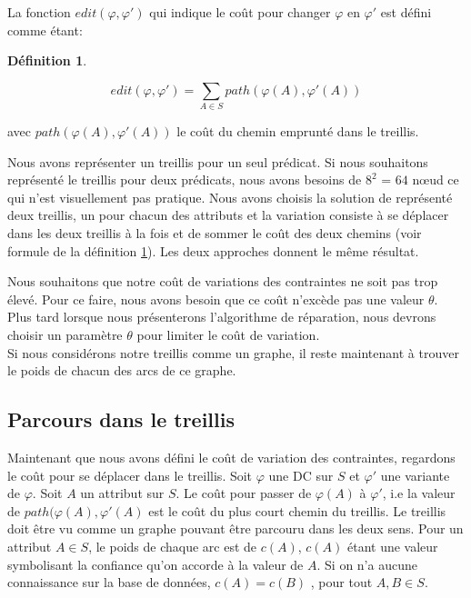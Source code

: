\documentclass[letterpaper, 12pt]{report}
\theoremstyle{definition}
\newtheorem{mydef}{Définition}
\begin{document}
La fonction $edit(\varphi , \varphi ')$ qui indique le coût pour changer $\varphi$ en $\varphi'$ est défini comme étant:

\begin{mydef} \label{edit}

$$
 edit(\varphi, \varphi') = \sum_{A \in S} path(\varphi(A),\varphi'(A))$$
 
avec $path(\varphi(A),\varphi'(A))$ le coût du chemin emprunté dans le treillis.
\end{mydef}

Nous avons représenter un treillis pour un seul prédicat. Si nous souhaitons représenté le treillis pour deux prédicats, nous avons besoins de $8^2$ = $64$ nœud ce qui n'est visuellement pas pratique. Nous avons choisis la solution de représenté deux treillis, un pour chacun des attributs et la variation consiste à se déplacer dans les deux treillis à la fois et de sommer le coût des deux chemins (voir formule de la définition \ref{edit}). Les deux approches donnent le même résultat.

Nous souhaitons que notre coût de variations des contraintes ne soit pas trop élevé. Pour ce faire, nous avons besoin que ce coût n'excède pas une valeur $\theta$. Plus tard lorsque nous présenterons l'algorithme de réparation, nous devrons choisir un paramètre $\theta$ pour limiter le coût de variation.\\

Si nous considérons notre treillis comme un graphe, il reste maintenant à trouver le poids de chacun des arcs de ce graphe. 

\subsection{Parcours dans le treillis}

	Maintenant que nous avons défini le coût de variation des contraintes, regardons le coût pour se déplacer dans le treillis. Soit $\varphi$ une DC sur $S$ et $\varphi'$ une variante de $\varphi$. Soit $A$ un attribut sur $S$. Le coût pour passer de $\varphi(A)$ à $\varphi'$, i.e la valeur de $path(\varphi(A),\varphi'(A)$ est le coût du plus court chemin du treillis. Le treillis doit être vu comme un graphe pouvant être parcouru dans les deux sens. Pour un attribut $A\in S$, le poids de chaque arc est de $c(A)$, $c(A)$ étant une valeur symbolisant la confiance qu'on accorde à la valeur de $A$. Si on n'a aucune connaissance sur la base de données, $c(A) =c(B)$ , pour tout $A,B \in S$.
	
\end{document}
